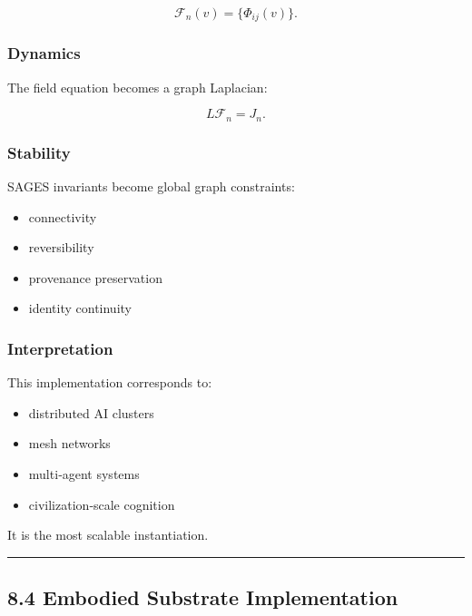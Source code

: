 \[
\mathcal{F}_n(v) = \{\Phi_{ij}(v)\}.
\]

\subsubsection{Dynamics}\label{dynamics-1}

The field equation becomes a graph Laplacian:

\[
L \mathcal{F}_n = J_n.
\]

\subsubsection{Stability}\label{stability-2}

SAGES invariants become global graph constraints:

\begin{itemize}
\tightlist
\item
  connectivity\\
\item
  reversibility\\
\item
  provenance preservation\\
\item
  identity continuity
\end{itemize}

\subsubsection{Interpretation}\label{interpretation-2}

This implementation corresponds to:

\begin{itemize}
\tightlist
\item
  distributed AI clusters\\
\item
  mesh networks\\
\item
  multi‑agent systems\\
\item
  civilization‑scale cognition
\end{itemize}

It is the most scalable instantiation.

\begin{center}\rule{0.5\linewidth}{0.5pt}\end{center}

\subsection{8.4 Embodied Substrate Implementation}\label{embodied-substrate-implementation}


